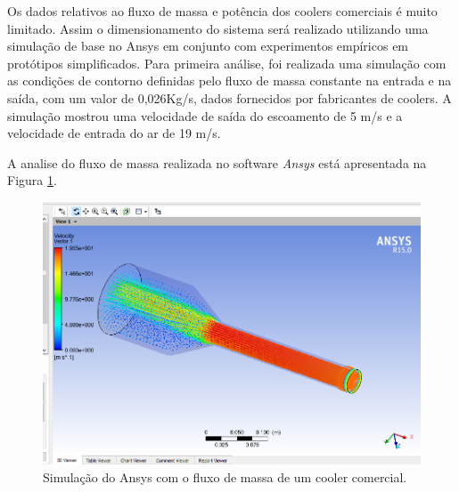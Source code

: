 		Os dados relativos ao fluxo de massa e potência dos coolers comerciais é muito limitado. Assim o dimensionamento do sistema será realizado utilizando uma simulação de base no Ansys em conjunto com experimentos empíricos em protótipos simplificados. Para primeira análise, foi realizada uma simulação com as condições de contorno definidas pelo fluxo de massa constante na entrada e na saída, com um valor de 0,026Kg/s, dados fornecidos por fabricantes de coolers. A simulação mostrou uma velocidade de saída do escoamento de 5 m/s e a velocidade de entrada do ar de 19 m/s.

		A analise do fluxo de massa realizada no software \textit{Ansys} está apresentada na Figura \ref{img:analise_fluxo}.

		\begin{figure}[H]
			\centering
			\includegraphics[scale=0.4]{figuras/analise_fluxo.png}
			\caption{Simulação do Ansys com o fluxo de massa de um cooler comercial.}
			\label{img:analise_fluxo}
		\end{figure}



